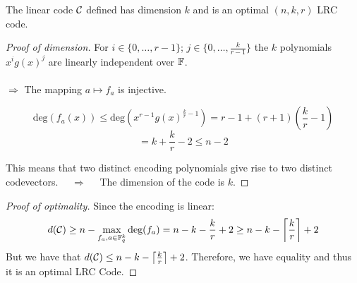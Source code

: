 \begin{frame}
    \begin{thm}
        The linear code $\mathcal{C}$ defined has dimension $k$ and is an optimal $(n,k,r)$ LRC code.
    \end{thm}
\end{frame}

\begin{frame}
    \begin{proof}[Proof of dimension]
        For $i \in \{0, \dots, r-1 \}$; $j \in \{0, \dots, \frac{k}{r-1}\}$ the $k$ polynomials $x^i g(x)^j$ are linearly independent over $\mathbb{F}$. \\~\\
        
        $\Rightarrow$ The mapping $a \mapsto f_a$ is injective.
        
        $$\mbox{deg}(f_a(x)) \leq \mbox{deg}(x^{r-1} g(x)^{\frac{k}{r}-1}) = r-1 + (r+1)(\frac{k}{r}-1)$$
        $$= k + \frac{k}{r} - 2 \leq n - 2$$
        
        This means that two distinct encoding polynomials give rise to two distinct codevectors. $\quad \Rightarrow \quad $ The dimension of the code is $k$.
    \end{proof}
\end{frame}

\begin{frame}
    \begin{proof}[Proof of optimality]
        Since the encoding is linear:
        $$d(\mathcal{C}) \geq n - \max_{f_a, a\in \mathbb{F}_q^k} \mbox{deg}(f_a) = n - k - \frac{k}{r} + 2 \geq n - k - \left\lceil\frac{k}{r}\right\rceil + 2$$
        But we have that $d(\mathcal{C}) \leq n - k - \left\lceil\frac{k}{r}\right\rceil + 2$.
        Therefore, we have equality and thus it is an optimal LRC Code.
    \end{proof}
\end{frame}